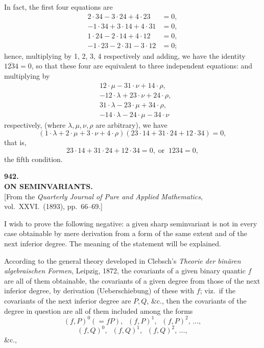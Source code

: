 \documentclass[11pt]{article}
\begin{document}
In fact, the first four equations are
\begin{align*}
2\cdot 34 - 3\cdot 24 + 4\cdot 23 &= 0,\\
-1\cdot 34 + 3\cdot 14 + 4\cdot 31 &= 0,\\
1\cdot 24 - 2\cdot 14 + 4\cdot 12 &= 0,\\
-1\cdot 23 - 2\cdot 31 - 3\cdot 12 &= 0;
\end{align*}
hence, multiplying by 1, 2, 3, 4 respectively and adding, we have the identity $\overline{1234} = 0$, so that these four are equivalent to three independent equations: and multiplying by
\begin{align*}
& 12\cdot \mu - 31\cdot \nu + 14\cdot \rho,\\
& -12\cdot \lambda + 23\cdot \nu + 24\cdot \rho,\\
& 31\cdot \lambda - 23\cdot \mu + 34\cdot \rho,\\
& -14\cdot \lambda - 24\cdot \mu - 34\cdot \nu
\end{align*}
respectively, (where $\lambda, \mu, \nu, \rho$ are arbitrary), we have
\[ (1\cdot \lambda + 2\cdot \mu + 3\cdot \nu + 4\cdot \rho)(23\cdot 14 + 31\cdot 24 + 12\cdot 34) = 0, \]
that is,
\[ 23\cdot 14 + 31\cdot 24 + 12\cdot 34 = 0,\;\text{or}\;\; 1234 = 0, \]
the fifth condition.

\bigskip
\begin{center}
\textbf{\large 942.}\\[4pt]
\textbf{ON SEMINVARIANTS.}\\[6pt]
[From the \textit{Quarterly Journal of Pure and Applied Mathematics}, vol.\ XXVI.\ (1893), pp.\ 66--69.]
\end{center}

I wish to prove the following negative: a given sharp seminvariant is not in every case obtainable by mere derivation from a form of the same extent and of the next inferior degree. The meaning of the statement will be explained.

According to the general theory developed in Clebsch's \textit{Theorie der bin\"aren algebraischen Formen}, Leipzig, 1872, the covariants of a given binary quantic $f$ are all of them obtainable, the covariants of a given degree from those of the next inferior degree, by derivation (Ueberschiebung) of these with $f$; viz.\ if the covariants of the next inferior degree are $P, Q$, \&c., then the covariants of the degree in question are all of them included among the forms
\[ (f,P)^0 (=fP),\;\; (f,P)^1,\;\; (f,P)^2,\,\ldots,\]
\[ (f,Q)^0,\;\; (f,Q)^1,\;\; (f,Q)^2,\,\ldots,\]
\&c.,
\end{document}
